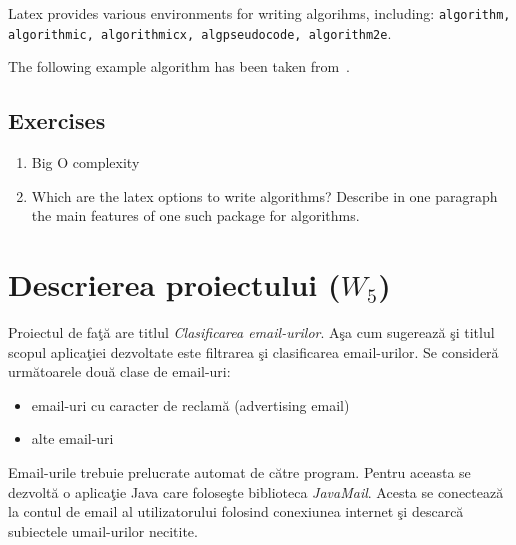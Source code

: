 \documentclass[a4paper,12pt]{report}
\begin{document}
Latex provides various environments for writing algorihms, including: 
\texttt{algorithm, algorithmic, algorithmicx, algpseudocode, algorithm2e}.

The following example algorithm has been taken from~\cite{7034697}.


\section{Exercises}
\begin{enumerate}
 \item Big O complexity
 \item Which are the latex options to write algorithms? 
 Describe in one paragraph the main features of one such package for algorithms.
\end{enumerate}

\vspace{0.5cm}

\vspace{0.5cm}









\chapter{Descrierea proiectului ($W_5$)}

  \par
  Proiectul de fa\c t\u a are titlul \textit{Clasificarea email-urilor}. A\c sa cum sugereaz\u a \c si titlul
  scopul aplica\c tiei dezvoltate este filtrarea \c si clasificarea email-urilor. Se consider\u a urm\u atoarele
  dou\u a clase de email-uri:
  
  \begin{itemize}
    \item email-uri cu caracter de reclam\u a (advertising email)
    \item alte email-uri
  \end{itemize}

  Email-urile trebuie prelucrate automat de c\u atre program. Pentru aceasta se dezvolt\u a o aplica\c tie Java 
  care folose\c ste biblioteca \textit{JavaMail}. Acesta se conecteaz\u a la contul de email al utilizatorului folosind 
  conexiunea internet \c si descarc\u a subiectele umail-urilor necitite.
  
\end{document}

